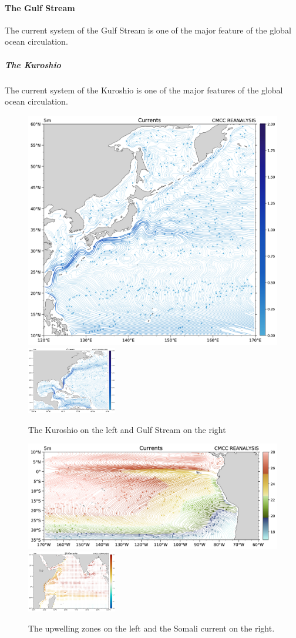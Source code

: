 \paragraph{The Gulf Stream}\label{the-gulf-stream}

The current system of the Gulf Stream is one of the major feature of the
global ocean circulation.


\subparagraph{The Kuroshio}\label{the-kuroshio}

The current system of the Kuroshio is one of the major features of the
global ocean circulation.


\begin{figure}[htpb!]
	\centering
	\includegraphics[width = 0.30 \textwidth]{uploads/44.png}\quad \includegraphics[width = 0.35\textwidth]{uploads/43.png}
	\caption{The Kuroshio on the left and Gulf Stream on the right} \label{fig:}
\end{figure}

\begin{figure}[htpb!]
	\centering
	\includegraphics[width = 0.45 \textwidth]{uploads/45.png}\quad \includegraphics[width = 0.35\textwidth]{uploads/46.png}
	\caption{The upwelling zones on the left and the Somali current on the right.} \label{fig:upwelzone}
\end{figure}




